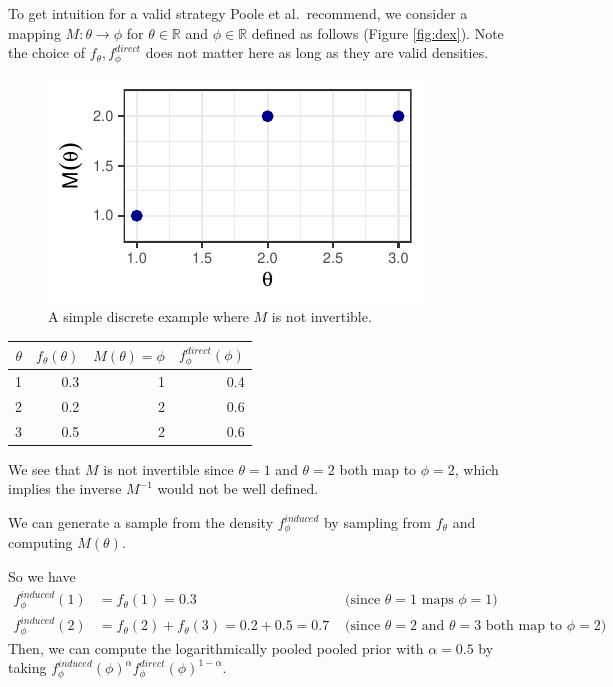 \documentclass[12pt,twoside]{smiththesis}
\begin{document}
To get intuition for a valid strategy Poole et al.~recommend, we consider a mapping \(M: \theta \to \phi\) for \(\theta \in \mathbb{R}\) and \(\phi \in \mathbb{R}\)
defined as follows (Figure \ref{fig:dex}). Note the choice of \(f_\theta,f_\phi^{direct}\) does not matter here as long as they are valid densities.
\begin{multicols}{2}
\begin{figure}

{\centering \includegraphics[width=1\linewidth]{thesis_files/figure-latex/unnamed-chunk-12-1} 

}

\caption{\label{fig:dex}A simple discrete example where $M$ is not invertible.}\label{fig:unnamed-chunk-12}
\end{figure}
\columnbreak
\begin{table}[H]
\centering
\begin{tabular}[t]{r|r|r|r}
\hline
$\theta$ & $f_\theta(\theta)$ & $M(\theta)=\phi$ & $f_\phi^{direct}(\phi)$\\
\hline
1 & 0.3 & 1 & 0.4\\
\hline
2 & 0.2 & 2 & 0.6\\
\hline
3 & 0.5 & 2 & 0.6\\
\hline
\end{tabular}
\end{table}
\end{multicols}
We see that \(M\) is not invertible since \(\theta=1\) and \(\theta = 2\) both map to \(\phi=2\), which implies the inverse \(M^{-1}\) would not be well defined.

We can generate a sample from the density \(f_\phi^{induced}\) by sampling from \(f_\theta\) and computing \(M(\theta)\).

So we have
\begin{align*}
f_\phi^{induced}(1) &= f_{\theta}(1) = 0.3 & \text{ (since $\theta = 1$ maps $\phi = 1$) } \\
f_\phi^{induced}(2) &= f_{\theta}(2) +  f_{\theta}(3) = 0.2 + 0.5=  0.7 & \text{ (since $\theta = 2$ and $\theta=3$ both map to $\phi = 2$) }
\end{align*}
Then, we can compute the logarithmically pooled pooled prior with \(\alpha=0.5\) by taking \(f_\phi^{induced}(\phi)^{\alpha} f_\phi^{direct}(\phi)^{1-\alpha}\).
\end{document}
